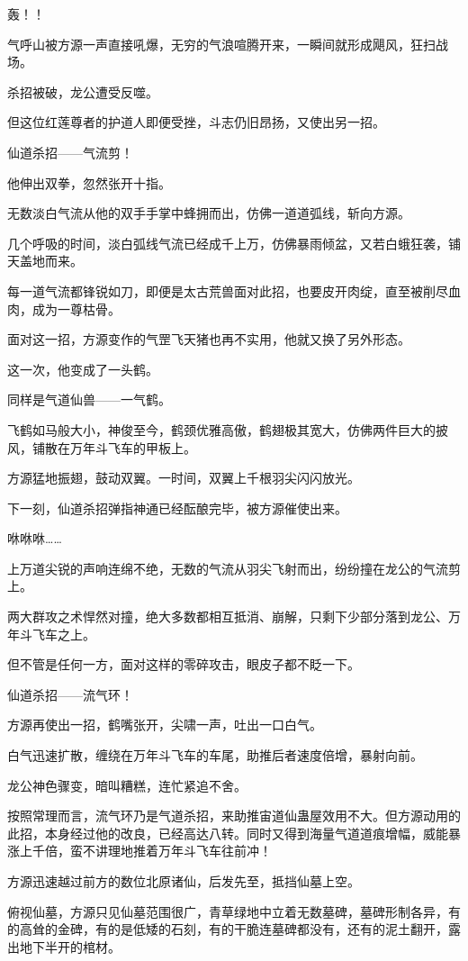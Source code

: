 \begin{this_body}
轰！！

气呼山被方源一声直接吼爆，无穷的气浪喧腾开来，一瞬间就形成飓风，狂扫战场。

杀招被破，龙公遭受反噬。

但这位红莲尊者的护道人即便受挫，斗志仍旧昂扬，又使出另一招。

仙道杀招——气流剪！

他伸出双拳，忽然张开十指。

无数淡白气流从他的双手手掌中蜂拥而出，仿佛一道道弧线，斩向方源。

几个呼吸的时间，淡白弧线气流已经成千上万，仿佛暴雨倾盆，又若白蛾狂袭，铺天盖地而来。

每一道气流都锋锐如刀，即便是太古荒兽面对此招，也要皮开肉绽，直至被削尽血肉，成为一尊枯骨。

面对这一招，方源变作的气罡飞天猪也再不实用，他就又换了另外形态。

这一次，他变成了一头鹤。

同样是气道仙兽——一气鹤。

飞鹤如马般大小，神俊至今，鹤颈优雅高傲，鹤翅极其宽大，仿佛两件巨大的披风，铺散在万年斗飞车的甲板上。

方源猛地振翅，鼓动双翼。一时间，双翼上千根羽尖闪闪放光。

下一刻，仙道杀招弹指神通已经酝酿完毕，被方源催使出来。

咻咻咻……

上万道尖锐的声响连绵不绝，无数的气流从羽尖飞射而出，纷纷撞在龙公的气流剪上。

两大群攻之术悍然对撞，绝大多数都相互抵消、崩解，只剩下少部分落到龙公、万年斗飞车之上。

但不管是任何一方，面对这样的零碎攻击，眼皮子都不眨一下。

仙道杀招——流气环！

方源再使出一招，鹤嘴张开，尖啸一声，吐出一口白气。

白气迅速扩散，缠绕在万年斗飞车的车尾，助推后者速度倍增，暴射向前。

龙公神色骤变，暗叫糟糕，连忙紧追不舍。

按照常理而言，流气环乃是气道杀招，来助推宙道仙蛊屋效用不大。但方源动用的此招，本身经过他的改良，已经高达八转。同时又得到海量气道道痕增幅，威能暴涨上千倍，蛮不讲理地推着万年斗飞车往前冲！

方源迅速越过前方的数位北原诸仙，后发先至，抵挡仙墓上空。

俯视仙墓，方源只见仙墓范围很广，青草绿地中立着无数墓碑，墓碑形制各异，有的高耸的金碑，有的是低矮的石刻，有的干脆连墓碑都没有，还有的泥土翻开，露出地下半开的棺材。


\end{this_body}
